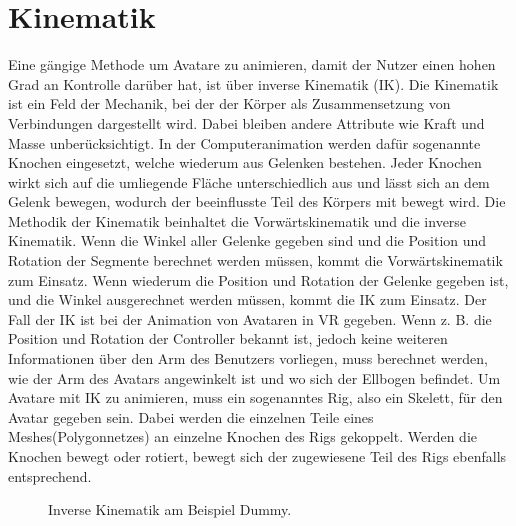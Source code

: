 \section{Kinematik}
Eine gängige Methode um Avatare zu animieren, damit der Nutzer einen hohen Grad an Kontrolle darüber hat, ist über inverse Kinematik (IK). Die Kinematik ist ein Feld der Mechanik, bei der der Körper als Zusammensetzung von Verbindungen dargestellt wird. Dabei bleiben andere Attribute wie Kraft und Masse unberücksichtigt. In der Computeranimation werden dafür sogenannte Knochen eingesetzt, welche wiederum aus Gelenken bestehen. Jeder Knochen wirkt sich auf die umliegende Fläche unterschiedlich aus und lässt sich an dem Gelenk bewegen, wodurch der beeinflusste Teil des Körpers mit bewegt wird.
Die Methodik der Kinematik beinhaltet die Vorwärtskinematik und die inverse Kinematik. Wenn die Winkel aller Gelenke gegeben sind und die Position und Rotation der Segmente berechnet werden müssen, kommt die Vorwärtskinematik zum Einsatz. Wenn wiederum die Position und Rotation der Gelenke gegeben ist, und die Winkel ausgerechnet werden müssen, kommt die IK zum Einsatz. Der Fall der IK ist bei der Animation von Avataren in VR gegeben. Wenn z. B. die Position und Rotation der Controller bekannt ist, jedoch keine weiteren Informationen über den Arm des Benutzers vorliegen, muss berechnet werden, wie der Arm des Avatars angewinkelt ist und wo sich der Ellbogen befindet.\cite{Xia2009}
Um Avatare mit IK zu animieren, muss ein sogenanntes Rig, also ein Skelett, für den Avatar gegeben sein. Dabei werden die einzelnen Teile eines Meshes(Polygonnetzes) an einzelne Knochen des Rigs gekoppelt. Werden die Knochen bewegt oder rotiert, bewegt sich der zugewiesene Teil des Rigs ebenfalls entsprechend.
\begin{figure}[h]
  \caption[Inverse Kinematik am Beispiel Dummy]{Inverse Kinematik am Beispiel Dummy.}
  \label{fig:IKDummy}
\end{figure}
